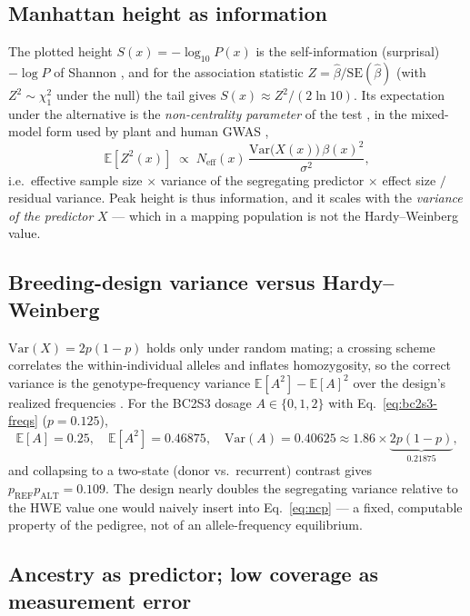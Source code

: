 \documentclass[11pt]{article}
\newcommand{\REF}{\mathrm{REF}}
\newcommand{\ALT}{\mathrm{ALT}}
\begin{document}
\subsection{Manhattan height as information}
\label{sec:noncentrality}

The plotted height $S(x)=-\log_{10}P(x)$ is the self-information (surprisal)
$-\log P$ of Shannon \citep{shannon_1948}, and for the association statistic
$Z=\hat\beta/\mathrm{SE}(\hat\beta)$ (with $Z^2\sim\chi^2_1$ under the null) the tail
gives $S(x)\approx Z^2/(2\ln 10)$. Its expectation under the alternative is the
\emph{non-centrality parameter} of the test \citep{sham_purcell_2014}, in the
mixed-model form used by plant and human GWAS \citep{yu_2006,zhou_stephens_2012},
\begin{equation}
\mathbb{E}[Z^2(x)] \;\propto\; N_{\text{eff}}(x)\,\frac{\mathrm{Var}\!\big(X(x)\big)\,\beta(x)^2}{\sigma^2},
\label{eq:ncp}
\end{equation}
i.e.\ effective sample size $\times$ variance of the segregating predictor $\times$
effect size $/$ residual variance. Peak height is thus information, and it scales
with the \emph{variance of the predictor} $X$ --- which in a mapping population is not
the Hardy--Weinberg value.

\subsection{Breeding-design variance versus Hardy--Weinberg}
\label{sec:designvar}

$\mathrm{Var}(X)=2p(1-p)$ holds only under random mating; a crossing scheme
correlates the within-individual alleles and inflates homozygosity, so the correct
variance is the genotype-frequency variance $\mathbb{E}[A^2]-\mathbb{E}[A]^2$ over the
design's realized frequencies \citep{lander_botstein_1989,yu_2008}. For the BC2S3
dosage $A\in\{0,1,2\}$ with Eq.~\eqref{eq:bc2s3-freqs} ($p=0.125$),
\begin{equation}
\mathbb{E}[A]=0.25,\quad \mathbb{E}[A^2]=0.46875,\quad
\mathrm{Var}(A)=0.40625 \approx 1.86\times \underbrace{2p(1-p)}_{0.21875},
\label{eq:vara}
\end{equation}
and collapsing to a two-state (donor vs.\ recurrent) contrast gives
$p_{\REF}p_{\ALT}=0.109$. The design nearly doubles the segregating variance relative
to the HWE value one would naively insert into Eq.~\eqref{eq:ncp} --- a fixed,
computable property of the pedigree, not of an allele-frequency equilibrium.

\subsection{Ancestry as predictor; low coverage as measurement error}
\label{sec:predictor}
\end{document}
